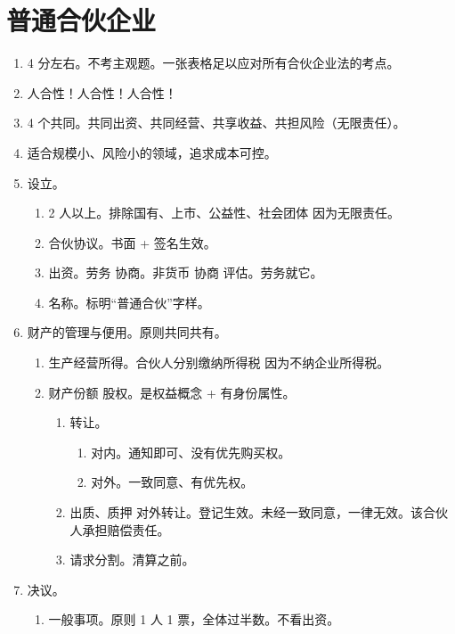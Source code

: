\section{普通合伙企业}
\begin{enumerate}
  \item 4 分左右。不考主观题。一张表格足以应对所有合伙企业法的考点。
  \item 人合性！人合性！人合性！
  \item 4 个共同。共同出资、共同经营、共享收益、共担风险（无限责任）。
  \item 适合规模小、风险小的领域，追求成本可控。
  \item 设立。
        \begin{enumerate}
          \item 2 人以上。排除国有、上市、公益性、社会团体 \yjt 因为无限责任。
          \item 合伙协议。书面 + 签名生效。
          \item 出资。劳务 \yjt 协商。非货币 \yjt 协商 \hz 评估。劳务就它。
          \item 名称。标明“普通合伙”字样。
        \end{enumerate}
  \item 财产的管理与便用。原则共同共有。
        \begin{enumerate}
          \item 生产经营所得。合伙人分别缴纳所得税 \yjt 因为不纳企业所得税。
          \item 财产份额 \ydy 股权。是权益概念 + 有身份属性。
                \begin{enumerate}
                  \item 转让。
                        \begin{enumerate}
                          \item 对内。通知即可、没有优先购买权。
                          \item 对外。一致同意、有优先权。
                        \end{enumerate}
                  \item 出质、质押 \ydy 对外转让。\yi 登记生效。\er 未经一致同意，一律无效。该合伙人承担赔偿责任。
                  \item 请求分割。清算之前。
                \end{enumerate}
        \end{enumerate}
  \item 决议。
        \begin{enumerate}
          \item 一般事项。原则 1 人 1 票，全体过半数。不看出资。

\end{enumerate}
\end{enumerate}
